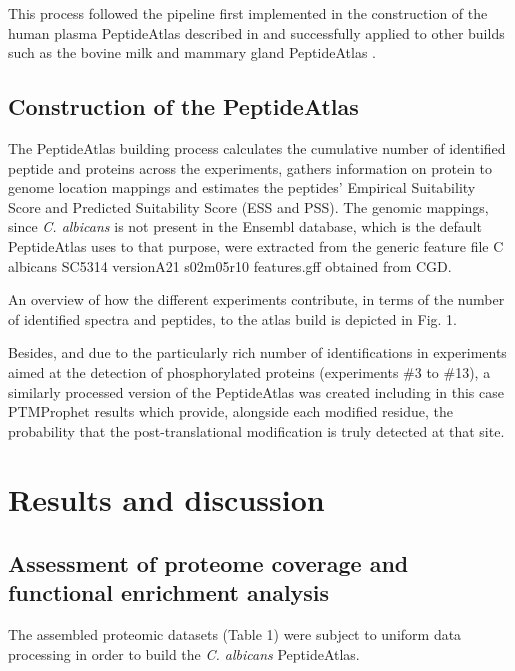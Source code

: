 This process followed the pipeline first implemented in the
construction of the human plasma PeptideAtlas described in
\citep{Farrah2011} and successfully applied to other builds such as the
bovine milk and mammary gland PeptideAtlas \citep{Bislev2012}.


\subsection*{Construction of the PeptideAtlas}

The PeptideAtlas building process calculates the cumulative
number of identified peptide and proteins across the experiments,
 gathers information on protein to genome location
mappings and estimates the peptides' Empirical Suitability
Score and Predicted Suitability Score (ESS and PSS). The genomic
mappings, since \textit{C. albicans} is not present in the Ensembl database,
 which is the default PeptideAtlas uses to that purpose, were
extracted from the generic feature file 
C albicans SC5314 versionA21 s02m05r10 features.gff
obtained from CGD.

An overview of how the different experiments contribute,
in terms of the number of identified spectra and peptides, to
the atlas build is depicted in Fig. 1.

Besides, and due to the particularly rich number of identifications
 in experiments aimed at the detection of phosphorylated proteins
  (experiments \#3 to \#13), a similarly processed
version of the PeptideAtlas was created including in this case
PTMProphet results which provide, alongside each modified
residue, the probability that the post-translational modification
is truly detected at that site.




\section*{Results and discussion}

\subsection*{Assessment of proteome coverage and functional enrichment analysis}

The assembled proteomic datasets (Table 1) were subject to
uniform data processing in order to build the \textit{C. albicans}
PeptideAtlas. 

